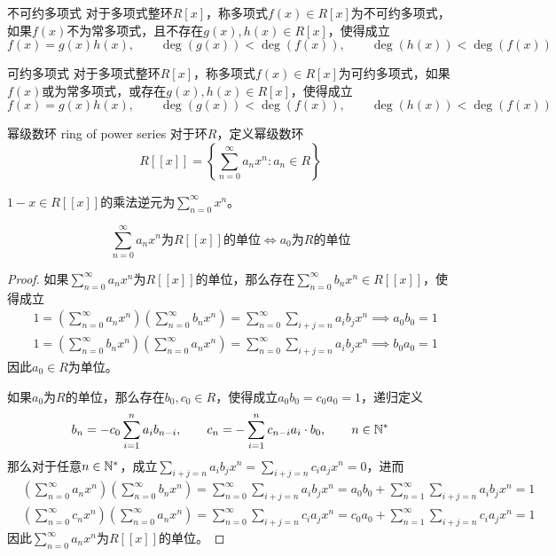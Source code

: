 \begin{definition}{不可约多项式}
	对于多项式整环$R[x]$，称多项式$f(x)\in R[x]$为不可约多项式，如果$f(x)$不为常多项式，且不存在$g(x),h(x)\in R[x]$，使得成立
	$$
	f(x)=g(x)h(x),\qquad 
	\deg(g(x))<\deg(f(x)),\qquad 
	\deg(h(x))<\deg(f(x))
	$$
\end{definition}

\begin{definition}{可约多项式}
	对于多项式整环$R[x]$，称多项式$f(x)\in R[x]$为可约多项式，如果$f(x)$或为常多项式，或存在$g(x),h(x)\in R[x]$，使得成立
	$$
	f(x)=g(x)h(x),\qquad 
	\deg(g(x))<\deg(f(x)),\qquad 
	\deg(h(x))<\deg(f(x))
	$$
\end{definition}

\begin{definition}{幂级数环 ring of power series}
	对于环$R$，定义幂级数环
	$$
	R[[x]]=\left\{ \sum_{n=0}^{\infty}a_nx^n:a_n\in R \right\}
	$$
\end{definition}

\begin{problem}
	$1-x\in R[[x]]$的乘法逆元为$\displaystyle \sum_{n=0}^{\infty}{x^n}$。
\end{problem}

\begin{proposition}
	$$
	\sum_{n=0}^{\infty}a_n x^n\text{为}R[[x]]\text{的单位}\iff a_0\text{为}R\text{的单位}
	$$
\end{proposition}

\begin{proof}
	如果$\displaystyle\sum_{n=0}^{\infty}a_n x^n$为$R[[x]]$的单位，那么存在$\displaystyle\sum_{n=0}^{\infty}b_n x^n\in R[[x]]$，使得成立
	\begin{align*}
		&1=\left( \sum_{n=0}^{\infty}a_n x^n \right)\left( \sum_{n=0}^{\infty}b_n x^n \right)
		=\sum_{n=0}^{\infty}\sum_{i+j=n}a_i b_j x^{n}\implies a_0b_0=1\\
		&1=\left( \sum_{n=0}^{\infty}b_n x^n \right)\left( \sum_{n=0}^{\infty}a_n x^n \right)
		=\sum_{n=0}^{\infty}\sum_{i+j=n}a_i b_j x^{n}\implies b_0a_0=1
	\end{align*}
	因此$a_0\in R$为单位。
	
	如果$a_0$为$R$的单位，那么存在$b_0,c_0\in R$，使得成立$a_0b_0=c_0a_0=1$，递归定义
	$$
	b_{n}=-c_0\sum_{i=1}^{n}a_ib_{n-i},\qquad c_n=-\sum_{i=1}^{n}c_{n-i}a_i\cdot b_0,\qquad n\in\mathbb{N}^*
	$$
	那么对于任意$n\in\mathbb{N}^*$，成立$\displaystyle \sum_{i+j=n}a_i b_j x^{n}=\sum_{i+j=n}c_i a_j x^{n}=0$​，进而
	\begin{align*}
		&\left( \sum_{n=0}^{\infty}a_n x^n \right)\left( \sum_{n=0}^{\infty}b_n x^n \right)
		=\sum_{n=0}^{\infty}\sum_{i+j=n}a_i b_j x^{n}=a_0b_0+\sum_{n=1}^{\infty}\sum_{i+j=n}a_i b_j x^{n}=1\\
		&\left( \sum_{n=0}^{\infty}c_n x^n \right)\left( \sum_{n=0}^{\infty}a_n x^n \right)
		=\sum_{n=0}^{\infty}\sum_{i+j=n}c_i a_j x^{n}=c_0a_0+\sum_{n=1}^{\infty}\sum_{i+j=n}c_i a_j x^{n}=1
	\end{align*}
	因此$\displaystyle\sum_{n=0}^{\infty}a_n x^n$为$R[[x]]$的单位。
\end{proof}


